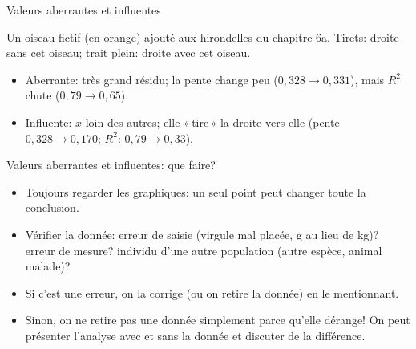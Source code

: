 \documentclass{BeamerTemplate}
\begin{document}
\begin{frame}[t]{Valeurs aberrantes et influentes}

\footnotesize
Un oiseau fictif (en orange) ajouté aux hirondelles du chapitre 6a. Tirets: droite
sans cet oiseau; trait plein: droite avec cet oiseau.

\centering
{}\hspace{3mm}

\raggedright
\begin{itemize}\itemsep0mm
  \item<2-> \alert{Aberrante}: très grand résidu; la pente change peu
  ($0{,}328\to0{,}331$), mais $R^2$ chute ($0{,}79\to0{,}65$).
  \item<3-> \alert{Influente}: $x$ loin des autres; elle «\,tire\,» la droite
  vers elle (pente $0{,}328\to0{,}170$; $R^2$: $0{,}79\to0{,}33$).
\end{itemize}

\end{frame}

\begin{frame}[t]{Valeurs aberrantes et influentes: que faire?}

\begin{itemize}\itemsep3mm
  \item Toujours \alert{regarder les graphiques}: un seul point peut changer toute
  la conclusion.
  \item<2-> Vérifier la donnée: erreur de saisie (virgule mal placée, g au lieu de
  kg)? erreur de mesure? individu d'une autre population (autre espèce, animal
  malade)?
  \item<3-> Si c'est une erreur, on la corrige (ou on retire la donnée) en le
  mentionnant.
  \item<4-> Sinon, on \alert{ne retire pas} une donnée simplement parce qu'elle
  dérange! On peut présenter l'analyse \alert{avec et sans} la donnée et discuter
  de la différence.
\end{itemize}

\end{frame}
\end{document}
